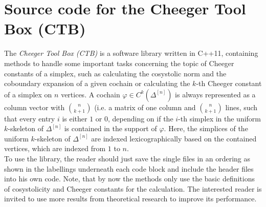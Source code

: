 \chapter{Source code for the Cheeger Tool Box (CTB)}

\label{AppendixA}

The \textit{Cheeger Tool Box (CTB)} is a software library written in C++11, containing methods to handle some important tasks concerning the topic of Cheeger constants of a simplex, such as calculating the cosystolic norm and the coboundary expansion of a given cochain or calculating the \(k\)-th Cheeger constant of a simplex on \(n\) vertices. A cochain \(\varphi\in C^k(\Delta^{[n]})\) is always represented as a column vector with \(\binom{n}{k+1}\) (i.e. a matrix of one column and  \(\binom{n}{k+1}\) lines, such that every entry \(i\) is either \(1\) or \(0\), depending on if the \(i\)-th simplex in the uniform \(k\)-skeleton of \(\Delta^{[n]}\) is contained in the support of \(\varphi\). Here, the simplices of the uniform \(k\)-skeleton of \(\Delta^{[n]}\) are indexed lexicographically based on the contained vertices, which are indexed from \(1\) to \(n\).\\
To use the library, the reader should just save the single files in an ordering as shown in the labellings underneath each code block and include the header files into his own code. Note, that by now the methods only use the basic definitions of cosystolicity and Cheeger constants for the calculation. The interested reader is invited to use more results from theoretical research to improve its performance.\\








